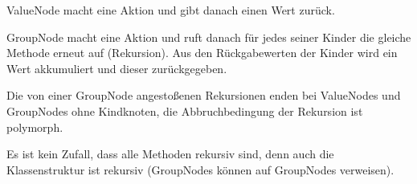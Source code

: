 ValueNode macht eine Aktion und gibt danach einen Wert zurück.

GroupNode macht eine Aktion und ruft danach für jedes seiner Kinder die gleiche Methode erneut auf (Rekursion). Aus den Rückgabewerten der Kinder wird ein Wert akkumuliert und dieser zurückgegeben.

Die von einer GroupNode angestoßenen Rekursionen enden bei ValueNodes und GroupNodes ohne Kindknoten, die Abbruchbedingung der Rekursion ist polymorph.

Es ist kein Zufall, dass alle Methoden rekursiv sind, denn auch die Klassenstruktur ist rekursiv (GroupNodes können auf GroupNodes verweisen).











